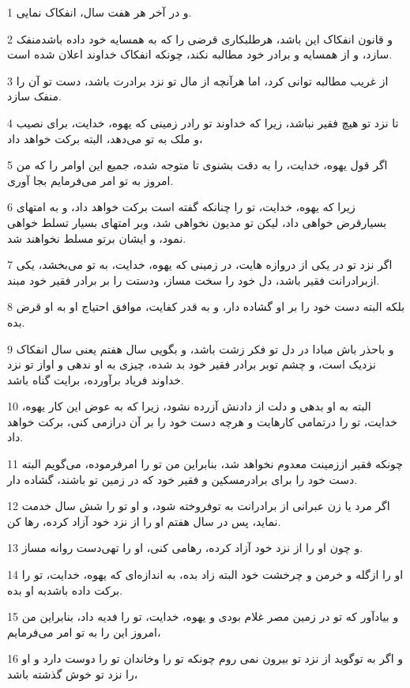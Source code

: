 \par 1 و در آخر هر هفت سال، انفکاک نمایی.
\par 2 و قانون انفکاک این باشد، هرطلبکاری قرضی را که به همسایه خود داده باشدمنفک سازد، و از همسایه و برادر خود مطالبه نکند، چونکه انفکاک خداوند اعلان شده است.
\par 3 از غریب مطالبه توانی کرد، اما هرآنچه از مال تو نزد برادرت باشد، دست تو آن را منفک سازد.
\par 4 تا نزد تو هیچ فقیر نباشد، زیرا که خداوند تو رادر زمینی که یهوه، خدایت، برای نصیب و ملک به تو می‌دهد، البته برکت خواهد داد،
\par 5 اگر قول یهوه، خدایت، را به دقت بشنوی تا متوجه شده، جمیع این اوامر را که من امروز به تو امر می‌فرمایم بجا آوری.
\par 6 زیرا که یهوه، خدایت، تو را چنانکه گفته است برکت خواهد داد، و به امتهای بسیارقرض خواهی داد، لیکن تو مدیون نخواهی شد، وبر امتهای بسیار تسلط خواهی نمود، و ایشان برتو مسلط نخواهند شد.
\par 7 اگر نزد تو در یکی از دروازه هایت، در زمینی که یهوه، خدایت، به تو می‌بخشد، یکی ازبرادرانت فقیر باشد، دل خود را سخت مساز، ودستت را بر برادر فقیر خود مبند.
\par 8 بلکه البته دست خود را بر او گشاده دار، و به قدر کفایت، موافق احتیاج او به او قرض بده.
\par 9 و باحذر باش مبادا در دل تو فکر زشت باشد، و بگویی سال هفتم یعنی سال انفکاک نزدیک است، و چشم توبر برادر فقیر خود بد شده، چیزی به او ندهی و اواز تو نزد خداوند فریاد برآورده، برایت گناه باشد.
\par 10 البته به او بدهی و دلت از دادنش آزرده نشود، زیرا که به عوض این کار یهوه، خدایت، تو را درتمامی کارهایت و هرچه دست خود را بر آن درازمی کنی، برکت خواهد داد.
\par 11 چونکه فقیر اززمینت معدوم نخواهد شد، بنابراین من تو را امرفرموده، می‌گویم البته دست خود را برای برادرمسکین و فقیر خود که در زمین تو باشند، گشاده دار.
\par 12 اگر مرد یا زن عبرانی از برادرانت به توفروخته شود، و او تو را شش سال خدمت نماید، پس در سال هفتم او را از نزد خود آزاد کرده، رها کن.
\par 13 و چون او را از نزد خود آزاد کرده، رهامی کنی، او را تهی‌دست روانه مساز.
\par 14 او را ازگله و خرمن و چرخشت خود البته زاد بده، به اندازه‌ای که یهوه، خدایت، تو را برکت داده باشدبه او بده.
\par 15 و بیادآور که تو در زمین مصر غلام بودی و یهوه، خدایت، تو را فدیه داد، بنابراین من امروز این را به تو امر می‌فرمایم،
\par 16 و اگر به توگوید از نزد تو بیرون نمی روم چونکه تو را وخاندان تو را دوست دارد و او را نزد تو خوش گذشته باشد،
